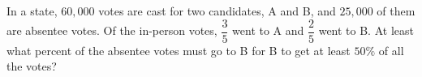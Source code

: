 In a state, $60{,}000$ votes are cast for two candidates, A and B, and $25{,}000$ of them are absentee votes. Of the in-person votes, $\dfrac35$ went to A and $\dfrac25$ went to B. At least what percent of the absentee votes must go to B for B to get at least $50\%$ of all the votes?
